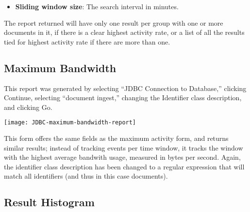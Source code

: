 \begin{changemargin}{1.5in}{0in}
\begin{itemize}
\begin{itemize}

\item \texttt{1(.)}: (up to) Ten groups of documents whose identifier starts
with 1, labeled 0-9, grouped by the second digit of their identifier.

\item \texttt{()}: One group of documents containing all documents 
regardless of identifier.

\item \texttt{17}: One group of documents whose identifier contains
the string ``17.''

\item \texttt{\^{}17}: One group of documents whose identifier \emph{starts}
with the string ``17.''

\end{itemize}

\item \textbf{Sliding window size}: The search interval in minutes.

\end{itemize}

The report returned will have only one result per group with one or more
documents in it, if there is a clear highest activity rate, or a list of
all the results tied for highest activity rate if there are more than one.

\subsection{Maximum Bandwidth}

This report was generated by selecting ``JDBC Connection to Database,''
clicking Continue, selecting ``document ingest,'' changing the Identifier
class description, and clicking Go.

\texttt{[image: JDBC-maximum-bandwidth-report]}

This form offers the same fields as the maximum activity form, and
returns similar results; instead of tracking events per time window,
it tracks the window with the highest average bandwith usage, measured
in bytes per second. Again, the identifier class description has been
changed to a regular expression that will match all identifiers (and
thus in this case documents).

\subsection{Result Histogram}


\end{changemargin}

